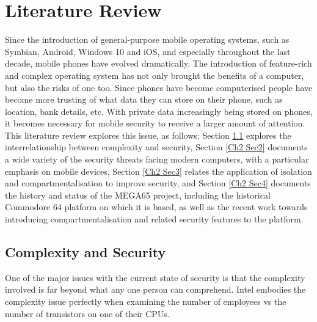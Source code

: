 
\chapter{Literature Review} %

\label{Chapter 2} %

Since the introduction of general-purpose mobile operating systems, such as Symbian, Android, Windows 10 and iOS, and especially throughout the last decade, mobile phones have evolved dramatically.\cite{Reference1} The introduction of feature-rich and complex operating system has not only brought the benefits of a computer, but also the risks of one too.\cite{Reference2} Since phones have become computerised people have become more trusting of what data they can store on their phone, such as location, bank details, etc.\cite{Reference3} With private data increasingly being stored on phones, it becomes necessary for mobile security to receive a larger amount of attention. This literature review explores this issue, as follows: Section \ref{Ch2 Sec1} explores the interrelationship between complexity and security, Section \ref{Ch2 Sec2} documents a wide variety of the security threats facing modern computers, with a particular emphasis on mobile devices, Section \ref{Ch2 Sec3} relates the application of isolation and compartmentalisation to improve security, and Section \ref{Ch2 Sec4} documents the history and status of the MEGA65 project, including the historical Commodore 64 platform on which it is based, as well as the recent work towards introducing compartmentalisation and related 
security features to the platform.


\section{Complexity and Security}

\label{Ch2 Sec1}

One of the major issues with the current state of security is that the complexity involved is far beyond what any one person can comprehend. Intel embodies the complexity issue perfectly when examining the number of employees vs the number of transistors on one of their CPUs.\\

